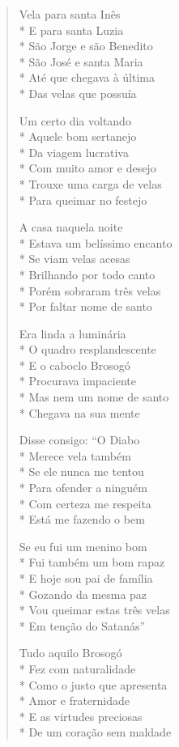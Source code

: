 \begin{verse}
Vela para santa Inês\\*
E para santa Luzia\\*
São Jorge e são Benedito\\*
São José e santa Maria\\*
Até que chegava à última\\*
Das velas que possuía

Um certo dia voltando\\*
Aquele bom sertanejo\\*
Da viagem lucrativa\\*
Com muito amor e desejo\\*
Trouxe uma carga de velas\\*
Para queimar no festejo

A casa naquela noite\\*
Estava um belíssimo encanto\\*
Se viam velas acesas\\*
Brilhando por todo canto\\*
Porém sobraram três velas\\*
Por faltar nome de santo

Era linda a luminária\\*
O quadro resplandescente\\*
E o caboclo Brosogó\\*
Procurava impaciente\\*
Mas nem um nome de santo\\*
Chegava na sua mente

Disse consigo: ``O Diabo\\*
Merece vela também\\*
Se ele nunca me tentou\\*
Para ofender a ninguém\\*
Com certeza me respeita\\*
Está me fazendo o bem

Se eu fui um menino bom\\*
Fui também um bom rapaz\\*
E hoje sou pai de família\\*
Gozando da mesma paz\\*
Vou queimar estas três velas\\*
Em tenção do Satanás''

Tudo aquilo Brosogó\\*
Fez com naturalidade\\*
Como o justo que apresenta\\*
Amor e fraternidade\\*
E as virtudes preciosas\\*
De um coração sem maldade


\end{verse}
